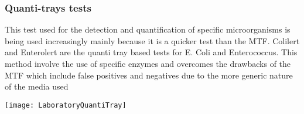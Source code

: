 \subsubsection{Quanti-trays tests}

This test used for the detection and quantification of specific microorganisms is being used increasingly mainly because it is a quicker test than the MTF.  Colilert and Enterolert are the quanti tray based tests for E. Coli and Enterococcus.  This method involve the use of specific enzymes and overcomes the drawbacks of the MTF which include false positives and negatives due to the more generic nature of the media used
\begin{center}
\texttt{[image: LaboratoryQuantiTray]}
\end{center}


\newpage
